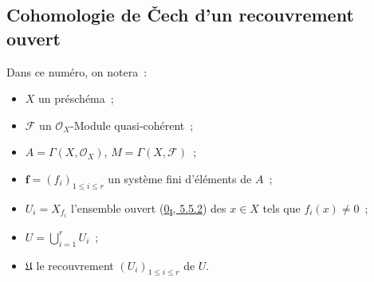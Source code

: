 \subsection{Cohomologie de Čech d'un recouvrement ouvert}
\label{subsection:III.1.2-fr}

\begin{notation}[1.2.1]
\label{III.1.2.1-fr}
Dans ce numéro, on notera~:
\begin{itemize}
\item $X$ un préschéma~;
\item $\mathcal F$ un $\mathcal O_X$-Module quasi-cohérent~;
\item $A=\Gamma(X,\mathcal O_X)$, $M=\Gamma(X,\mathcal F)$~;
\item $\mathbf f=(f_i)_{1\leq i\leq r}$ un système fini d'éléments de $A$~;
\item $U_i=X_{f_i}$ l'ensemble ouvert
(\hyperref[0.5.5.2-fr]{0\textsubscript{I}, 5.5.2}) des $x\in X$ tels que
$f_i(x)\neq0$~;
\item $U=\bigcup_{i=1}^r U_i$~;
\item $\mathfrak U$ le recouvrement $(U_i)_{1\leq i\leq r}$ de $U$.
\end{itemize}
\end{notation}

